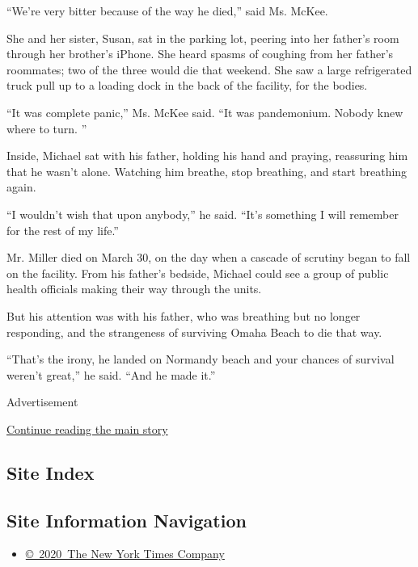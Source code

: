 ``We're very bitter because of the way he died,'' said Ms. McKee.

She and her sister, Susan, sat in the parking lot, peering into her
father's room through her brother's iPhone. She heard spasms of coughing
from her father's roommates; two of the three would die that weekend.
She saw a large refrigerated truck pull up to a loading dock in the back
of the facility, for the bodies.

``It was complete panic,'' Ms. McKee said. ``It was pandemonium. Nobody
knew where to turn. ''

Inside, Michael sat with his father, holding his hand and praying,
reassuring him that he wasn't alone. Watching him breathe, stop
breathing, and start breathing again.

``I wouldn't wish that upon anybody,'' he said. ``It's something I will
remember for the rest of my life.''

Mr. Miller died on March 30, on the day when a cascade of scrutiny began
to fall on the facility. From his father's bedside, Michael could see a
group of public health officials making their way through the units.

But his attention was with his father, who was breathing but no longer
responding, and the strangeness of surviving Omaha Beach to die that
way.

``That's the irony, he landed on Normandy beach and your chances of
survival weren't great,'' he said. ``And he made it.''

Advertisement

\protect\hyperlink{after-bottom}{Continue reading the main story}

\hypertarget{site-index}{%
\subsection{Site Index}\label{site-index}}

\hypertarget{site-information-navigation}{%
\subsection{Site Information
Navigation}\label{site-information-navigation}}

\begin{itemize}
\tightlist
\item
  \href{https://help.nytimes.com/hc/en-us/articles/115014792127-Copyright-notice}{©~2020~The
  New York Times Company}
\end{itemize}

